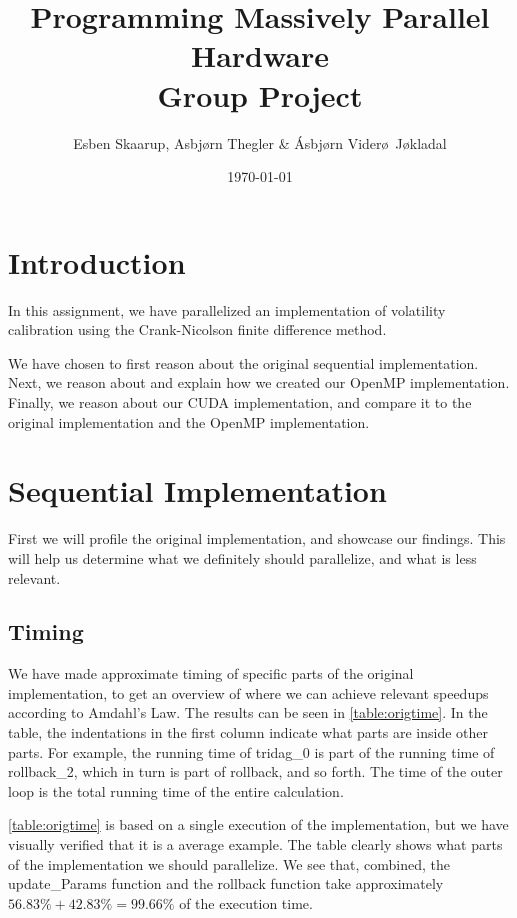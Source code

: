 \documentclass[11pt]{article}
\def\Title{Programming Massively Parallel Hardware\\
\vspace{1.5cm}
\textbf{Group Project}}
\def\Author{Esben Skaarup, Asbj\o rn Thegler \& \'{A}sbj\o rn Vider\o \ J\o kladal}
\begin{document}
\title{\Title}
\author{\Author}
\date{\today}
\maketitle

\section{Introduction}
In this assignment, we have parallelized an implementation of volatility calibration using the Crank-Nicolson finite difference method.

We have chosen to first reason about the original sequential implementation. 
Next, we reason about and explain how we created our OpenMP 
implementation. Finally, we reason about our CUDA implementation, and compare
it to the original implementation and the OpenMP implementation.

\section{Sequential Implementation}
First we will profile the original implementation, and showcase our findings.
This will help us determine what we definitely should parallelize, and what is
less relevant.

\subsection{Timing}
We have made approximate timing of specific parts of the original 
implementation, to get an overview 
of where we can achieve relevant speedups according to Amdahl's Law. The results
can be seen in \autoref{table:origtime}. In the table, the indentations 
in the first column indicate what parts are inside other parts. For example,
the running time of tridag\_0 is part of the running time of rollback\_2, which
in turn is part of rollback, and so forth. The time of the outer loop is the 
total running time of the entire calculation. 

\autoref{table:origtime} is based on a single execution of the implementation, 
but we have visually verified that it is a average example. 
The table clearly shows what parts of the implementation we should parallelize.
We see that, combined, the update\_Params function and the rollback function take approximately $56.83\%+42.83\%=99.66\%$ of the execution time.
\end{document}
